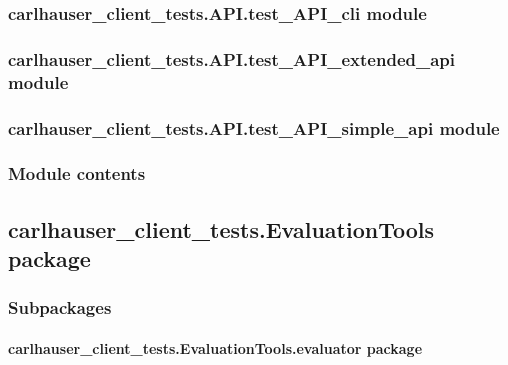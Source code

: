 \documentclass[letterpaper,10pt,english]{sphinxmanual}
\begin{document}
\subsubsection{carlhauser\_client\_tests.API.test\_API\_cli module}
\label{\detokenize{carlhauser_client_tests.API:carlhauser-client-tests-api-test-api-cli-module}}

\subsubsection{carlhauser\_client\_tests.API.test\_API\_extended\_api module}
\label{\detokenize{carlhauser_client_tests.API:carlhauser-client-tests-api-test-api-extended-api-module}}

\subsubsection{carlhauser\_client\_tests.API.test\_API\_simple\_api module}
\label{\detokenize{carlhauser_client_tests.API:carlhauser-client-tests-api-test-api-simple-api-module}}

\subsubsection{Module contents}
\label{\detokenize{carlhauser_client_tests.API:module-carlhauser_client_tests.API}}\label{\detokenize{carlhauser_client_tests.API:module-contents}}

\subsection{carlhauser\_client\_tests.EvaluationTools package}
\label{\detokenize{carlhauser_client_tests.EvaluationTools:carlhauser-client-tests-evaluationtools-package}}\label{\detokenize{carlhauser_client_tests.EvaluationTools::doc}}

\subsubsection{Subpackages}
\label{\detokenize{carlhauser_client_tests.EvaluationTools:subpackages}}

\paragraph{carlhauser\_client\_tests.EvaluationTools.evaluator package}
\label{\detokenize{carlhauser_client_tests.EvaluationTools.evaluator:carlhauser-client-tests-evaluationtools-evaluator-package}}\label{\detokenize{carlhauser_client_tests.EvaluationTools.evaluator::doc}}
\end{document}
